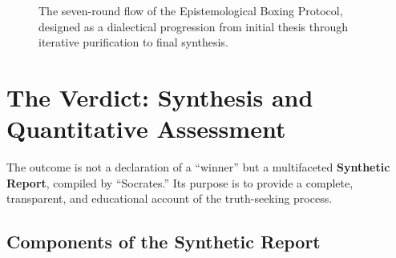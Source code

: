 \documentclass[11pt,a4paper]{article}
\begin{document}
\begin{figure}[htbp]
\centering
{}
\caption{The seven-round flow of the Epistemological Boxing Protocol, designed as a dialectical progression from initial thesis through iterative purification to final synthesis.}
\label{fig:round_flow}
\end{figure}

\section{The Verdict: Synthesis and Quantitative Assessment}

The outcome is not a declaration of a ``winner'' but a multifaceted \textbf{Synthetic Report}, compiled by ``Socrates.'' Its purpose is to provide a complete, transparent, and educational account of the truth-seeking process.

\subsection{Components of the Synthetic Report}
\end{document}

